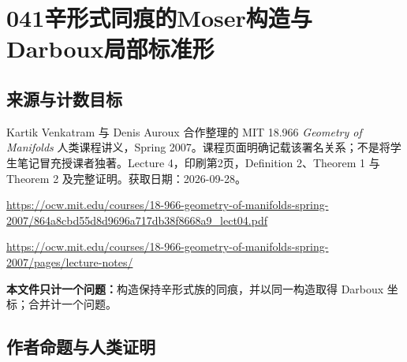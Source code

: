 \documentclass[UTF8,11pt]{ctexart}
\theoremstyle{definition}
\begin{document}
\section*{041\quad 辛形式同痕的Moser构造与Darboux局部标准形}
\subsection*{来源与计数目标}
Kartik Venkatram 与 Denis Auroux 合作整理的 MIT 18.966 \emph{Geometry of Manifolds} 人类课程讲义，Spring 2007。课程页面明确记载该署名关系；不是将学生笔记冒充授课者独著。Lecture 4，印刷第2页，Definition 2、Theorem 1 与 Theorem 2 及完整证明。获取日期：2026-09-28。
\par\url{https://ocw.mit.edu/courses/18-966-geometry-of-manifolds-spring-2007/864a8cbd55d8d9696a717db38f8668a9_lect04.pdf}
\par\url{https://ocw.mit.edu/courses/18-966-geometry-of-manifolds-spring-2007/pages/lecture-notes/}
\par\textbf{本文件只计一个问题：}构造保持辛形式族的同痕，并以同一构造取得 Darboux 坐标；合并计一个问题。
\subsection*{作者命题与人类证明}
\end{document}
